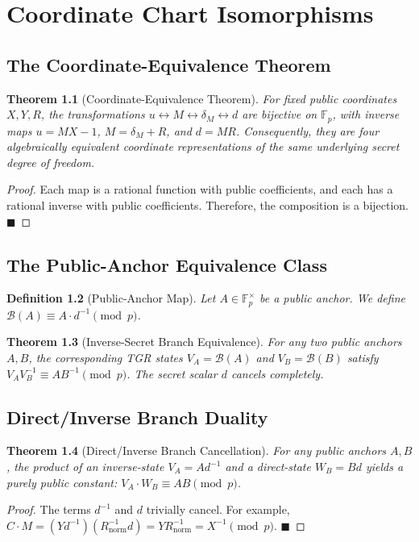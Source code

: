 \documentclass[11pt, a4paper, twoside]{book}
\newtheorem{theorem}{Theorem}[chapter]
\newtheorem{definition}[theorem]{Definition}
\begin{document}
\chapter{Coordinate Chart Isomorphisms}

\section{The Coordinate-Equivalence Theorem}
\begin{theorem}[Coordinate-Equivalence Theorem]
For fixed public coordinates $X, Y, R$, the transformations $u \leftrightarrow M \leftrightarrow \delta_M \leftrightarrow d$ are bijective on $\mathbb{F}_p$, with inverse maps $u = MX - 1$, $M = \delta_M + R$, and $d = MR$. Consequently, they are four algebraically equivalent coordinate representations of the same underlying secret degree of freedom.
\end{theorem}
\begin{proof}
Each map is a rational function with public coefficients, and each has a rational inverse with public coefficients. Therefore, the composition is a bijection. $\blacksquare$
\end{proof}

\section{The Public-Anchor Equivalence Class}
\begin{definition}[Public-Anchor Map]
Let $A \in \mathbb{F}_p^\times$ be a public anchor. We define $\mathcal{B}(A) \equiv A \cdot d^{-1} \pmod p$.
\end{definition}
\begin{theorem}[Inverse-Secret Branch Equivalence]
For any two public anchors $A, B$, the corresponding TGR states $V_A = \mathcal{B}(A)$ and $V_B = \mathcal{B}(B)$ satisfy $V_A V_B^{-1} \equiv A B^{-1} \pmod p$. The secret scalar $d$ cancels completely.
\end{theorem}

\section{Direct/Inverse Branch Duality}
\begin{theorem}[Direct/Inverse Branch Cancellation]
For any public anchors $A, B$, the product of an inverse-state $V_A = A d^{-1}$ and a direct-state $W_B = B d$ yields a purely public constant: $V_A \cdot W_B \equiv A B \pmod p$.
\end{theorem}
\begin{proof}
The terms $d^{-1}$ and $d$ trivially cancel. For example, $C \cdot M = (Y d^{-1})(R_{\text{norm}}^{-1} d) = Y R_{\text{norm}}^{-1} = X^{-1} \pmod p$. $\blacksquare$
\end{proof}
\end{document}
